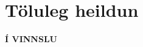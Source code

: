 \documentclass[A4paper,10pt,icelandic]{sphinxmanual}
\begin{document}
 \chapter{Töluleg heildun}
 \textbf{Í VINNSLU}
% 
% 
\end{document}
